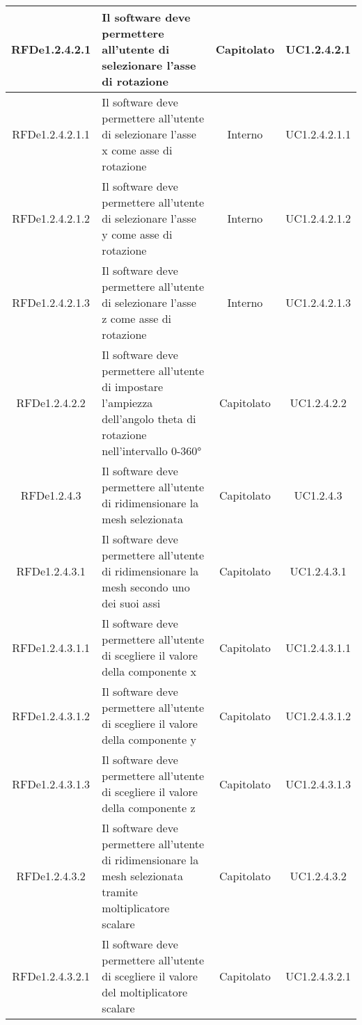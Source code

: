 \begin{longtable}{|c|p{6cm}|c|c|}
\midrule
RFDe1.2.4.2.1
& Il software deve permettere all'utente di selezionare l'asse di rotazione
& Capitolato
& UC1.2.4.2.1
\\


\midrule
RFDe1.2.4.2.1.1
& Il software deve permettere all'utente di selezionare l'asse x come asse di rotazione
& Interno
& UC1.2.4.2.1.1
\\


\midrule
RFDe1.2.4.2.1.2
& Il software deve permettere all'utente di selezionare l'asse y come asse di rotazione
& Interno
& UC1.2.4.2.1.2
\\


\midrule
RFDe1.2.4.2.1.3
& Il software deve permettere all'utente di selezionare l'asse z come asse di rotazione
& Interno
& UC1.2.4.2.1.3
\\


\midrule
RFDe1.2.4.2.2
& Il software deve permettere all'utente di impostare l'ampiezza dell'angolo theta di rotazione nell'intervallo 0-360°
& Capitolato
& UC1.2.4.2.2
\\


\midrule
RFDe1.2.4.3
& Il software deve permettere all'utente di ridimensionare la mesh selezionata
& Capitolato
& UC1.2.4.3
\\


\midrule
RFDe1.2.4.3.1
& Il software deve permettere all'utente di ridimensionare la mesh secondo uno dei suoi assi
& Capitolato
& UC1.2.4.3.1
\\


\midrule
RFDe1.2.4.3.1.1
& Il software deve permettere all'utente di scegliere il valore della componente x
& Capitolato
& UC1.2.4.3.1.1
\\


\midrule
RFDe1.2.4.3.1.2
& Il software deve permettere all'utente di scegliere il valore della componente y
& Capitolato
& UC1.2.4.3.1.2
\\


\midrule
RFDe1.2.4.3.1.3
& Il software deve permettere all'utente di scegliere il valore della componente z
& Capitolato
& UC1.2.4.3.1.3
\\


\midrule
RFDe1.2.4.3.2
& Il software deve permettere all'utente di ridimensionare la mesh selezionata tramite moltiplicatore scalare
& Capitolato
& UC1.2.4.3.2
\\


\midrule
RFDe1.2.4.3.2.1
& Il software deve permettere all'utente di scegliere il valore del moltiplicatore scalare
& Capitolato
& UC1.2.4.3.2.1
\\



\end{longtable}
